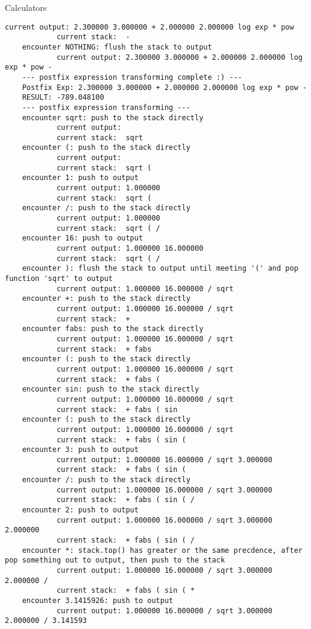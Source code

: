 \begin{homeworkProblem}{Calculators}
\begin{lstlisting}[breaklines=true]
            current output: 2.300000 3.000000 + 2.000000 2.000000 log exp * pow
            current stack:  -
    encounter NOTHING: flush the stack to output
            current output: 2.300000 3.000000 + 2.000000 2.000000 log exp * pow -
    --- postfix expression transforming complete :) ---
    Postfix Exp: 2.300000 3.000000 + 2.000000 2.000000 log exp * pow -
    RESULT: -789.048100
    --- postfix expression transforming ---
    encounter sqrt: push to the stack directly
            current output:
            current stack:  sqrt
    encounter (: push to the stack directly
            current output:
            current stack:  sqrt (
    encounter 1: push to output
            current output: 1.000000
            current stack:  sqrt (
    encounter /: push to the stack directly
            current output: 1.000000
            current stack:  sqrt ( /
    encounter 16: push to output
            current output: 1.000000 16.000000
            current stack:  sqrt ( /
    encounter ): flush the stack to output until meeting '(' and pop function 'sqrt' to output
            current output: 1.000000 16.000000 / sqrt
    encounter +: push to the stack directly
            current output: 1.000000 16.000000 / sqrt
            current stack:  +
    encounter fabs: push to the stack directly
            current output: 1.000000 16.000000 / sqrt
            current stack:  + fabs
    encounter (: push to the stack directly
            current output: 1.000000 16.000000 / sqrt
            current stack:  + fabs (
    encounter sin: push to the stack directly
            current output: 1.000000 16.000000 / sqrt
            current stack:  + fabs ( sin
    encounter (: push to the stack directly
            current output: 1.000000 16.000000 / sqrt
            current stack:  + fabs ( sin (
    encounter 3: push to output
            current output: 1.000000 16.000000 / sqrt 3.000000
            current stack:  + fabs ( sin (
    encounter /: push to the stack directly
            current output: 1.000000 16.000000 / sqrt 3.000000
            current stack:  + fabs ( sin ( /
    encounter 2: push to output
            current output: 1.000000 16.000000 / sqrt 3.000000 2.000000
            current stack:  + fabs ( sin ( /
    encounter *: stack.top() has greater or the same precdence, after pop something out to output, then push to the stack
            current output: 1.000000 16.000000 / sqrt 3.000000 2.000000 /
            current stack:  + fabs ( sin ( *
    encounter 3.1415926: push to output
            current output: 1.000000 16.000000 / sqrt 3.000000 2.000000 / 3.141593

\end{lstlisting}
\end{homeworkProblem}
